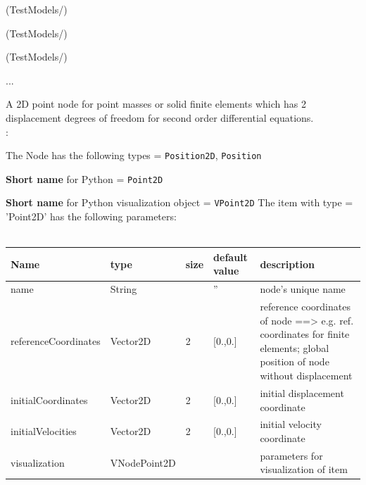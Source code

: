 \item {} (TestModels/)
\item {} (TestModels/)
\item {} (TestModels/)
\item  ...


\ei

%
\newpage


\label{sec:item:NodePoint2D}
A 2D point node for point masses or solid finite elements which has 2 displacement degrees of freedom for second order differential equations.
\vspace{12pt}\\

\noindent {}:
\bi
  \item The Node has the following types = \texttt{Position2D}, \texttt{Position}
  \item {\bf Short name} for Python = \texttt{Point2D}
  \item {\bf Short name} for Python visualization object = \texttt{VPoint2D}
\ei\vspace{12pt} \noindent 
The item  with type = 'Point2D' has the following parameters:
\vspace{-0.5cm}\\
\vspace{-0.5cm}\\
\begin{center}
  \footnotesize
  \begin{longtable}{| p{4.5cm} | p{2.5cm} | p{0.5cm} | p{2.5cm} | p{6cm} |}
    \hline
    \bf Name & \bf type & \bf size & \bf default value & \bf description \\ \hline
    name &     String &      &     '' &     node's unique name\\ \hline
    referenceCoordinates &     Vector2D &     2 &     [0.,0.] &     reference coordinates of node ==> e.g. ref. coordinates for finite elements; global position of node without displacement\\ \hline
    initialCoordinates &     Vector2D &     2 &     [0.,0.] &     initial displacement coordinate\\ \hline
    initialVelocities &     Vector2D &     2 &     [0.,0.] &     initial velocity coordinate\\ \hline
    visualization &     VNodePoint2D &      &      &     parameters for visualization of item\\ \hline
\end{longtable}
\end{center}

